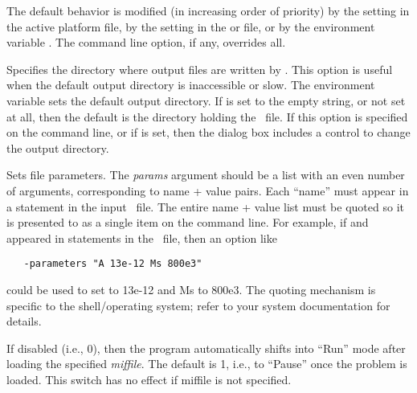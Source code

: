 \begin{description}
  The default behavior is modified (in increasing order of priority) by the
   setting in the active  platform
  file, by the  setting in the 
  or  file, or by the environment variable
  .  The
   command line option, if any, overrides all.
\item[\optkey{-outdir dir}]
  Specifies the directory where output files are written by
  .  This option is useful when the default output
  directory is inaccessible or slow. The environment variable
   sets the
  default output directory.  If  is set to the empty
  string, or not set at all, then the default is the directory holding
  the \MIF\ file.  If this option is specified on the command line, or
  if  is set, then the 
   dialog box includes a control to change
  the output directory.
\item[\optkey{-parameters params}]
  Sets  file
  parameters.  The \textit{params} argument should be a list with an
  even number of arguments, corresponding to name + value pairs.  Each
  ``name'' must appear in a
  statement in the input
  \MIF\ file.  The entire name + value list must be quoted so it is
  presented to  as a single item on the command line.  For
  example, if  and  appeared in  statements
  in the \MIF\ file, then an option like
\begin{verbatim}
   -parameters "A 13e-12 Ms 800e3"
\end{verbatim}
  could be used to set  to 13e-12 and Ms to 800e3.  The quoting
  mechanism is specific to the shell/operating system; refer to your system
  documentation for details.
\item[\optkey{-pause \boa 0\pipe 1\bca}]
  If disabled (i.e., 0), then the program automatically shifts into
  ``Run'' mode after loading the specified \textit{miffile}. The default
  is 1, i.e., to ``Pause'' once the problem is loaded. This switch has
  no effect if miffile is not specified.
\item[\optkey{-restart \boa 0\pipe 1\bca\index{simulation~3D!restarting}}]

\end{description}
